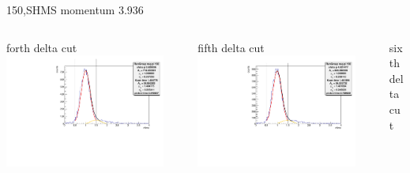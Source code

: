 \documentclass[aspectratio=169,xcolor=dvipsnames]{beamer}
\begin{document}
\begin{frame}{150,SHMS momentum 3.936}
\begin{columns}
\begin{column}[T]{0.3\textwidth}
\end{column}
\end{columns}
\begin{columns}
\begin{column}[T]{0.3\textwidth}
forth delta cut \\
\includegraphics[width = 0.9\textwidth]{results/pid/rftime/rftime_neg_150_3_pi.pdf}
\end{column}
\begin{column}[T]{0.3\textwidth}
fifth delta cut \\
\includegraphics[width = 0.9\textwidth]{results/pid/rftime/rftime_neg_150_4_pi.pdf}
\end{column}
\begin{column}[T]{0.3\textwidth}
sixth delta cut \\

\end{column}
\end{columns}
\end{frame}
\end{document}

